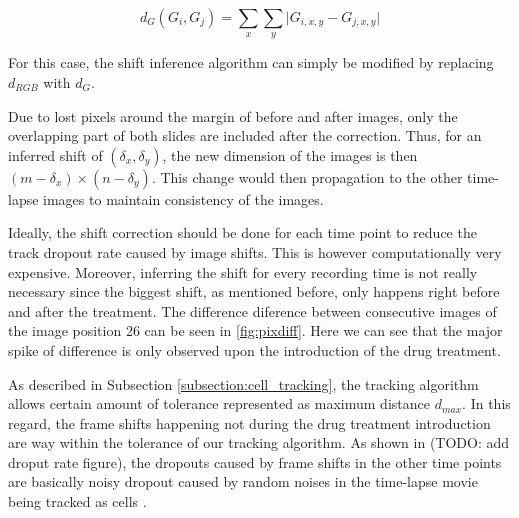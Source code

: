 \documentclass[pdftex,12pt,a4paper]{report}
\begin{document}
$$
d_G(G_i, G_j) =  \sum_{x} \sum_{y} \vert G_{i, x, y} - G_{j, x, y}\vert
$$

For this case, the shift inference algorithm can simply be modified by replacing $d_{RGB}$ with $d_G$.

Due to lost pixels around the margin of before and after images, only the overlapping part of both slides are included after the correction. Thus, for an inferred shift of $(\delta_x, \delta_y)$, the new dimension of the images is then $(m - \delta_x) \times (n - \delta_y)$. This change would then propagation to the other time-lapse images to maintain consistency of the images.

Ideally, the shift correction should be done for each time point to reduce the track dropout rate caused by image shifts. This is however computationally very expensive. Moreover, inferring the shift for every recording time is not really necessary since the biggest shift, as mentioned before, only happens right before and after the treatment. The difference diference between consecutive images of the image position 26 can be seen in \ref{fig:pixdiff}. Here we can see that the major spike of difference is only observed upon the introduction of the drug treatment.

As described in Subsection \ref{subsection:cell_tracking}, the tracking algorithm allows certain amount of tolerance represented as maximum distance $d_{max}$. In this regard, the frame shifts happening not during the drug treatment introduction are way within the tolerance of our tracking algorithm. As shown in (TODO: add droput rate figure), the dropouts caused by frame shifts in the other time points are basically noisy dropout caused by random noises in the time-lapse movie being tracked as cells \cite{jaqaman2008robust}.
\end{document}
